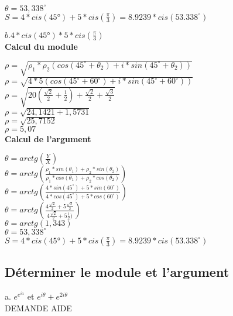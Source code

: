 $\theta = 53,338^{\circ}$ \\

$ S = 4*cis(45°) + 5*cis(\frac{\pi}{3}) = 8.9239 * cis(53.338^{\circ})$

\newpage

$b. 4*cis(45°) * 5*cis(\frac{\pi}{3})$ \\

\textbf{Calcul du module} \\
\vspace{3mm} %

$\rho = \sqrt{\rho_1*\rho_2 (cos(45^{\circ} + \theta_2)+ i* sin(45^{\circ}+ \theta_2)) }$ \\

$\rho = \sqrt{4*5 (cos(45^{\circ} + 60^{\circ})+ i* sin(45^{\circ}+ 60^{\circ})) }$ \\

$\rho = \sqrt{20  (\frac{\sqrt{2}}{2} + \frac{1}{2}) + \frac{\sqrt{2}} {2} + \frac{\sqrt{3}} {2} }$\\

$\rho = \sqrt{24,1421 + 1,5731 }$\\

$\rho = \sqrt{25,7152}$\\

$\rho = 5,07$\\

\textbf{Calcul de l'argument} \\
\vspace{3mm} %

$\theta = arctg(\frac{Y}{X})$\\

$\theta = arctg(\frac{\rho_1 * sin(\theta_1) + \rho_2 * sin(\theta_2)} {\rho_1 * cos(\theta_1) + \rho_2 * cos(\theta_2)})$ \\

$\theta = arctg(\frac{4 * sin(45^{\circ}) + 5 * sin(60^{\circ})} {4 * cos(45^{\circ}) + 5 * cos(60^{\circ})})$ \\

$\theta = arctg(\frac{4\frac{\sqrt{2}} {2} + 5\frac{\sqrt{3}} {2}} {4\frac{\sqrt{2}} {2} + 5\frac{1} {2})})$ \\

$\theta = arctg(1,343)$ \\

$\theta = 53,338^{\circ}$ \\

$ S = 4*cis(45°) + 5*cis(\frac{\pi}{3}) = 8.9239 * cis(53.338^{\circ})$ \\

\subsection{Déterminer le module et l'argument}

a. $e^{e^{ia}}$  et $e^{i\theta} + e^{2i\theta} $ \\

DEMANDE AIDE \\

